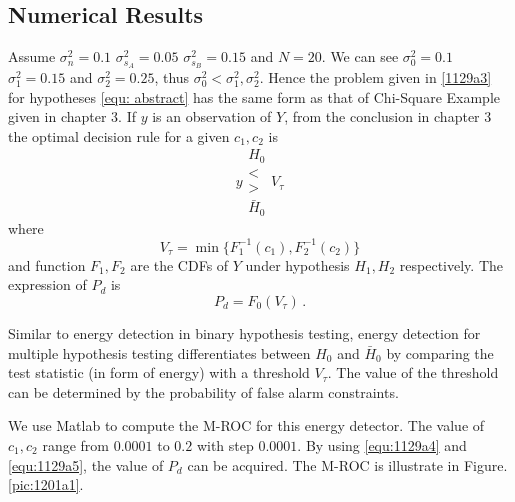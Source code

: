 \subsection{Numerical Results}
Assume $\sigma_n^2=0.1$ $\sigma_{s_A}^2=0.05$ $\sigma_{s_B}^2=0.15$ and $N=20$. We can see $\sigma_0^2=0.1$ $\sigma_1^2=0.15$ and $\sigma_2^2=0.25$, 
thus $\sigma_0^2 < \sigma_1^2, \sigma_2^2$. Hence the problem given in \eqref{1129a3} for hypotheses \eqref{equ: abstract} has the same form as that of Chi-Square Example given in chapter 3. 
If $y$ is an observation of $Y$, 
from the conclusion in chapter 3 the optimal  decision rule for a given $c_1, c_2$ is 
\begin{equation}
  y \substack{H_0 \\ < \\ > \\ \bar{H}_0} V_\tau
  \label{equ:1129a4}
\end{equation}
where 
\begin{equation}
  V_\tau = \min\{F_1^{-1}(c_1),  F_2^{-1}(c_2)\}
  \label{equ:2015may1a2}
\end{equation}
and function $F_1,  F_2$ are the CDFs of $Y$ under hypothesis $H_1, H_2$ respectively. The expression of $P_d$ is 
\begin{equation}
  P_d = F_0(V_\tau)\,.
  \label{equ:1129a5}
\end{equation}

Similar to energy detection in binary hypothesis testing, energy detection for multiple hypothesis testing differentiates between $H_0$ and $\bar{H}_0$ by comparing the test statistic (in form of energy) with a threshold $V_\tau$. The value of the threshold can be determined by the probability of false alarm constraints.   

We use Matlab to compute the M-ROC for this energy detector. The value of $c_1, c_2$ range from $0.0001$ to $0.2$ with step $0.0001$. By using \eqref{equ:1129a4} and \eqref{equ:1129a5}, the value of $P_d$ can be acquired. The M-ROC is illustrate in Figure. \ref{pic:1201a1}. 


